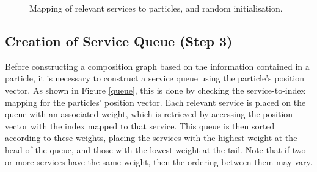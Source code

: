 \documentclass{llncs}
\begin{document}
\begin{figure}[h]
\centerline{
}
 \caption{Mapping of relevant services to particles, and random initialisation.}
 \label{mapping}
\end{figure}

\subsection{Creation of Service Queue (Step 3)}

Before constructing a composition graph based on the information contained in a particle, it is necessary to construct a service queue using the particle's position vector. As shown in Figure \ref{queue}, this is done by checking the service-to-index mapping for the particles' position vector. Each relevant service is placed on the queue with an associated weight, which is retrieved by accessing the position vector with the index mapped to that service. This queue is then sorted according to these weights, placing the services with the highest weight at the head of the queue, and those with the lowest weight at the tail. Note that if two or more services have the same weight, then the ordering between them may vary.
\end{document}
